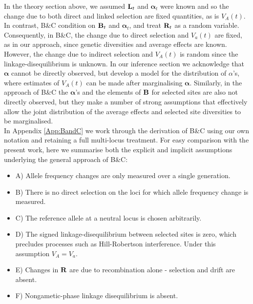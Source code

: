 \documentclass[12pt]{article}
\begin{document}
\begin{bibunit}
In the theory section above, we assumed ${\bf L}_t$ and $\boldsymbol{\alpha}_t$ were known and so the change due to both direct and linked selection are fixed quantities, as is $V_A(t)$. In contrast, B\&C condition on ${\bf B}_t$ and $\boldsymbol{\alpha}_t$, and treat ${\bf R}_t$ as a random variable. Consequently, in B\&C, the change due to direct selection and $V_a(t)$ are fixed, as in our approach, since genetic diversities and average effects are known. However, the change due to indirect selection and $V_A(t)$ is random since the linkage-disequilibrium is unknown.  In our inference section we acknowledge that $\boldsymbol{\alpha}$ cannot be directly observed, but develop a model for the distribution of $\alpha$'s, where estimates of $V_A(t)$ can be made after marginalising $\boldsymbol{\alpha}$. Similarly, in the approach of B\&C the $\boldsymbol{\alpha}$'s and the elements of ${\bf B}$ for selected sites are also not directly observed, but they make a number of strong assumptions that effectively allow the joint distribution of the average effects and selected site diversities to be marginalised.\\

In Appendix \ref{App:BandC} we work through the derivation of B\&C using our own notation and retaining a full multi-locus treatment. For easy comparison with the present work, here we summarise both the explicit and implicit  assumptions underlying the general approach of B\&C:
 
\begin{itemize}

\item A) Allele frequency changes are only measured over a single generation.

\item B) There is no direct selection on the loci for which allele frequency change is measured.

\item C) The reference allele at a neutral locus is chosen arbitrarily.

\item D) The signed linkage-disequilibrium between selected sites is zero, which precludes processes such as Hill-Robertson interference. Under this assumption $V_A=V_a$.

\item E) Changes in ${\bf R}$ are due to recombination alone - selection and drift are absent. 

\item F) Nongametic-phase linkage disequilibrium is absent.  


\end{itemize}
\end{bibunit}
\end{document}
